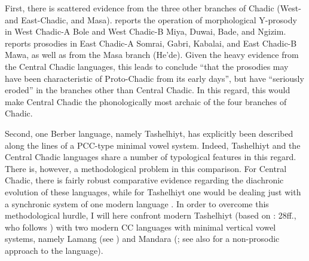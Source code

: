 \documentclass[output=paper]{langscibook}
\begin{document}
First, there is scattered evidence from the three other branches of Chadic (West- and East-Chadic, and Masa). \citet{Schuh2002} reports the operation of morphological Y-prosody in West Chadic-A Bole and West Chadic-B Miya, Duwai, Bade, and Ngizim. \citet{Roberts2007} reports prosodies in East Chadic-A Somrai, Gabri, Kabalai, and East Chadic-B Mawa, as well as from the Masa branch (He’de). Given the heavy evidence from the Central Chadic languages, this leads \citet[139]{Roberts2009} to conclude “that the prosodies may have been characteristic of Proto-Chadic from its early days”, but have “seriously eroded” in the branches other than Central Chadic. In this regard, this would make Central Chadic the phonologically most archaic of the four branches of Chadic.

Second, one Berber language, namely Tashelhiyt, has explicitly been described along the lines of a PCC-type minimal vowel system. Indeed, Tashelhiyt and the Central Chadic languages share a number of typological features in this regard. There is, however, a methodological problem in this comparison. For Central Chadic, there is fairly robust comparative evidence regarding the diachronic evolution of these languages, while for Tashelhiyt one would be dealing just with a synchronic system of one modern language \citep{DellElmedlaoui1985}. In order to overcome this methodological hurdle, I will here confront modern Tashelhiyt (based on \citealt{Kossmann2012}: 28ff., who follows \citealt{DellElmedlaoui1985}) with two modern CC languages with minimal vertical vowel systems, namely Lamang (see \citealt{Wolff2015}) and Mandara (\citealt{Mirt1969, FluckigerWhaley1981, WolffNaumann2004}; see also \citealt{Frajzyngier2012} for a non-prosodic approach to the language). 
\end{document}
